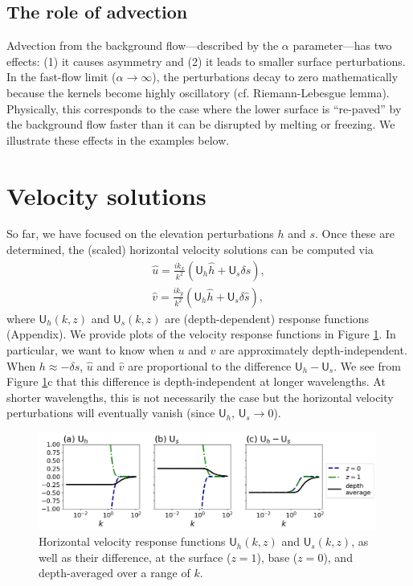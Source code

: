 \documentclass[paper=a4, fontsize=11pt]{article} %
\begin{document}
\subsection{The role of advection}
Advection from the background flow---described by the $\alpha$ parameter---has two effects:
(1) it causes asymmetry and (2) it leads to smaller surface perturbations.
In the fast-flow limit ($\alpha\to\infty$), the perturbations decay to zero mathematically because
the kernels become highly oscillatory (cf. Riemann-Lebesgue lemma). Physically, this corresponds
to the case where the lower surface is ``re-paved'' by the background flow
faster than it can be disrupted by melting or freezing. We illustrate these effects in the
examples below.

\section{Velocity solutions}
So far, we have focused on the elevation perturbations $h$ and $s$. Once these are determined,
the (scaled) horizontal velocity solutions can be computed via
\begin{eqnarray}
\widehat{u} =  \frac{ik_x}{k^2}\left(\mathsf{U}_h\widehat{h} +  \mathsf{U}_s\delta\widehat{s}\right), \label{uHf}\\
\widehat{v} = \frac{ik_y}{k^2}\left(\mathsf{U}_h\widehat{h} +  \mathsf{U}_s\delta\widehat{s}\right),\label{vHf}
\end{eqnarray}
where $\mathsf{U}_h(k,z)$ and $\mathsf{U}_s(k,z)$ are (depth-dependent) response functions (Appendix).
We provide plots of the velocity response functions in Figure \ref{fig:response}.
In particular, we want to know when $u$ and $v$ are approximately depth-independent.
When $h\approx-\delta s$, $\widehat{u}$ and $\widehat{v}$ are proportional
to the difference $\mathsf{U}_h-\mathsf{U}_s$. We see
from Figure \ref{fig:response}c that this difference is depth-independent at longer wavelengths.
At shorter wavelengths, this is not necessarily the case but the horizontal velocity perturbations
will eventually vanish (since $\mathsf{U}_h$, $\mathsf{U}_s\to 0$).

\begin{figure}
  \centering
\includegraphics[width=0.99\textwidth]{figs/fig6.png}
\caption{Horizontal velocity response functions $\mathsf{U}_h(k,z)$ and $\mathsf{U}_s(k,z)$,
as well as their difference, at the surface ($z=1$), base ($z=0$), and depth-averaged
over a range of $k$.}
\label{fig:response}
\end{figure}
\end{document}
